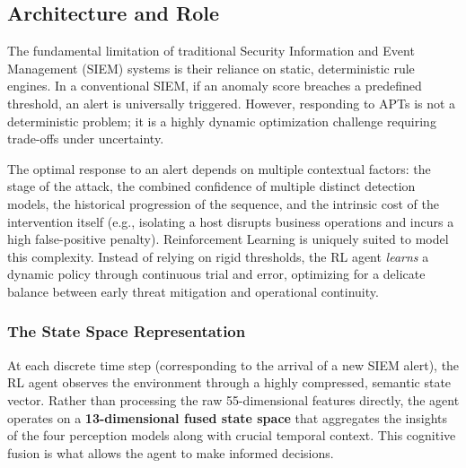 \subsection{Architecture and Role}
\label{subsec:rl_architecture}

The fundamental limitation of traditional Security Information and Event Management (SIEM) systems is their reliance on static, deterministic rule engines. In a conventional SIEM, if an anomaly score breaches a predefined threshold, an alert is universally triggered. However, responding to APTs is not a deterministic problem; it is a highly dynamic optimization challenge requiring trade-offs under uncertainty. 

The optimal response to an alert depends on multiple contextual factors: the stage of the attack, the combined confidence of multiple distinct detection models, the historical progression of the sequence, and the intrinsic cost of the intervention itself (e.g., isolating a host disrupts business operations and incurs a high false-positive penalty). Reinforcement Learning is uniquely suited to model this complexity. Instead of relying on rigid thresholds, the RL agent \textit{learns} a dynamic policy through continuous trial and error, optimizing for a delicate balance between early threat mitigation and operational continuity.

\subsubsection{The State Space Representation}

At each discrete time step (corresponding to the arrival of a new SIEM alert), the RL agent observes the environment through a highly compressed, semantic state vector. Rather than processing the raw 55-dimensional features directly, the agent operates on a \textbf{13-dimensional fused state space} that aggregates the insights of the four perception models along with crucial temporal context. This cognitive fusion is what allows the agent to make informed decisions.

